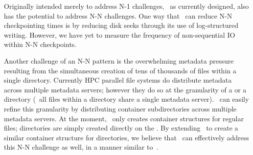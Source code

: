 Originally intended merely to address N-1 challenges, \plfs\, as currently
designed, also has the potential to address N-N challenges.  One way that
\plfs\ can reduce N-N checkpointing times is by reducing disk seeks through its
use of log-structured writing.  However, we have yet to measure the
frequency of non-sequential IO within N-N checkpoints.

Another challenge of an N-N pattern is the
overwhelming metadata pressure resulting from the simultaneous creation of tens
of thousands of files within a single directory.  Currently HPC parallel file
systems do distribute metadata across multiple metadata servers; however they do so
at the granularity of a  or a directory (\ie\ all files within a
directory share a single metadata server).  \plfs\ can easily refine this
granularity by distributing container subdirectories 
across multiple metadata servers.  At the moment, \plfs\ only creates container
structures for regular files; directories are simply created directly on the
\upfs.  By extending \plfs\ to create a similar container structure for
directories, we believe that \plfs\ can effectively address this N-N challenge
as well, in a manner similar to~\cite{gigaplus}.
